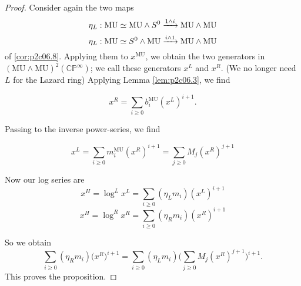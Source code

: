 \documentclass[../main]{subfiles}
\begin{document}
\begin{proof}
Consider again the two maps \[\eta_L : \mathrm{MU} \simeq \mathrm{MU} \wedge S^0 \lar{1 \wedge i} \mathrm{MU} \wedge \mathrm{MU}\] 
\[\eta_L : \mathrm{MU} \simeq S^0 \wedge \mathrm{MU} \lar{i \wedge 1} \mathrm{MU} \wedge \mathrm{MU}\] 
of \eqref{cor:p2c06.8}. Applying them to $x^{\mathrm{MU}}$, we obtain the two generators in $(\mathrm{MU} \wedge \mathrm {MU})^2 (\mathbb {CP}^\infty)$; we call these generators $x^L$ and $x^R$. (We no longer need $L$ for the Lazard ring) Applying Lemma \ref{lem:p2c06.3}, we find

\begin{equation}
\label{eqn:p2c09.5}
\tag{9.5}
x^R = \sum_{i \ge 0} b_i^{\mathrm{MU}} (x^L)^{i + 1}.
\end{equation}

Passing to the inverse power-series, we find

\begin{equation}
\label{eqn:p2c09.6}
\tag{9.6}
x^L = \sum_{i \ge 0} m_i^{\mathrm{MU}} (x^R)^{i + 1} = \sum_{j \ge 0} M_j (x^R)^{j + 1}
\end{equation}

Now our log series are
\[x^H = \log^L x^L = \sum_{i \ge 0} (\eta_L m_i) (x^L)^{i + 1}\]
\[x^H = \log^R x^R = \sum_{i \ge 0} (\eta_R m_i) (x^R)^{i + 1}\]

So we obtain \[\sum_{i \ge 0} (\eta_R m_i) \big(x^R\big)^{i + 1} = \sum_{i \ge 0} (\eta_L m_i) \bigg(\sum_{j \ge 0} M_j (x^R)^{j + 1}\bigg)^{i + 1}.\]
This proves the proposition.
\end{proof}
\end{document}
